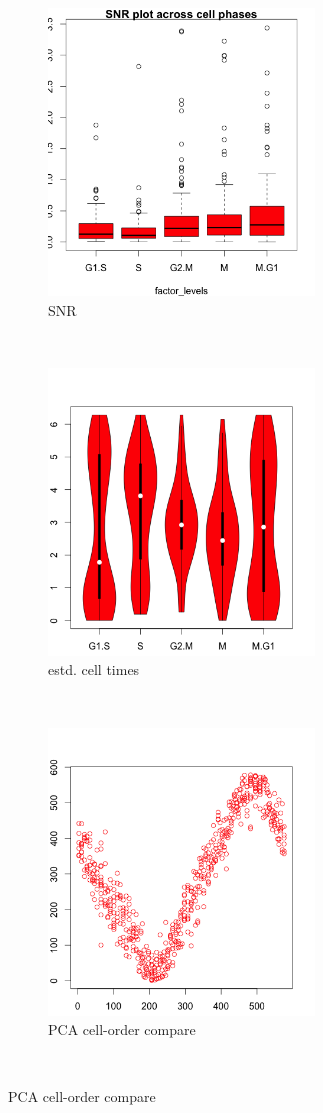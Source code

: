 \documentclass[11pt]{article}
\begin{document}
\begin{figure}[ht]
     \begin{subfigure}[t]{0.5\textwidth}
        \centering
        \includegraphics[height=3in]{../figures/cell_order_R_figs/snr_plot_phase_fixed.png}
        \caption{SNR}
    \end{subfigure}%
    ~
       \begin{subfigure}[t]{0.5\textwidth}
        \centering
        \includegraphics[height=3in]{../figures/cell_order_R_figs/cell_times_phase_fixed.png}
        \caption{estd. cell times }
    \end{subfigure}\\
    
     \begin{subfigure}[t]{0.5\textwidth}
        \centering
        \includegraphics[height=3in]{../figures/cell_order_R_figs/pca_cellorder_rank_phase_fixed.png}
        \caption{PCA cell-order compare}
    \end{subfigure}\\
    

\end{figure}
\end{document}
